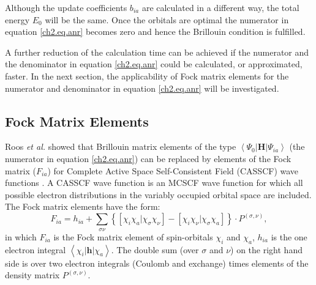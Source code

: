 Although the update coefficients $b_{ia}$ are calculated in a different way, the total energy $E_0$ will be the same. Once the orbitals are optimal the numerator in equation \ref{ch2.eq.anr} becomes zero and hence the Brillouin condition is fulfilled. 

A further reduction of the calculation time can be achieved if the numerator and the denominator in equation \ref{ch2.eq.anr} could be calculated, or approximated, faster. In the next section, the applicability of Fock matrix elements for the numerator and denominator in equation \ref{ch2.eq.anr} will be investigated.

\subsection{\label{ch2.sec.fock}Fock Matrix Elements} 

Roos \textit{et al.} showed that Brillouin matrix elements of the type $\left< \Psi_0 | \mathbf{H} | \Psi_{ia} \right>$ (the numerator in equation \ref{ch2.eq.anr}) can be replaced by elements of the Fock matrix ($F_{ia}$) for Complete Active Space Self-Consistent Field (CASSCF) wave functions \cite{roos1}. A CASSCF wave function is an MCSCF wave function for which all possible electron distributions in the variably occupied orbital space are included. The Fock matrix elements have the form:
\begin{equation}
F_{ia} = h_{ia} + \sum_{\sigma\nu} \left\{ \left[ \chi_i \chi_a | \chi_\sigma \chi_\nu \right] - \left[ \chi_i \chi_\nu | \chi_\sigma \chi_a \right] \right\} \cdot P^{(\sigma,\nu)},
\label{ch2.eq.fock}
\end{equation}
in which $F_{ia}$ is the Fock matrix element of spin-orbitals $\chi_i$ and $\chi_a$, $h_{ia}$ is the one electron integral $\left< \chi_i | \mathbf{h}| \chi_a \right>$. The double sum (over $\sigma$ and $\nu$) on the right hand side is over two electron integrals (Coulomb and exchange) times elements of the density matrix $P^{(\sigma,\nu)}$. 

